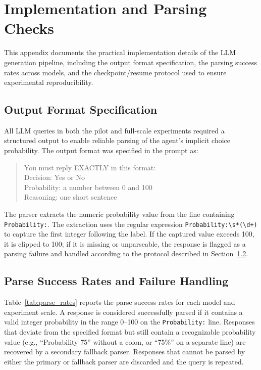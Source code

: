 \documentclass[11pt]{article}
\begin{document}
\section{Implementation and Parsing Checks}
\label{app:implementation}

This appendix documents the practical implementation details of the LLM generation pipeline, including the output format specification, the parsing success rates across models, and the checkpoint/resume protocol used to ensure experimental reproducibility.

\subsection{Output Format Specification}
\label{app:output_format}

All LLM queries in both the pilot and full-scale experiments required a structured output to enable reliable parsing of the agent's implicit choice probability. The output format was specified in the prompt as:

\begin{quote}\small
You must reply EXACTLY in this format:\\
Decision: Yes or No\\
Probability: a number between 0 and 100\\
Reasoning: one short sentence
\end{quote}

The parser extracts the numeric probability value from the line containing \texttt{Probability:}. The extraction uses the regular expression \texttt{Probability:\textbackslash s*(\textbackslash d+)} to capture the first integer following the label. If the captured value exceeds 100, it is clipped to 100; if it is missing or unparseable, the response is flagged as a parsing failure and handled according to the protocol described in Section~\ref{app:parse_handling}.

\subsection{Parse Success Rates and Failure Handling}
\label{app:parse_handling}

Table~\ref{tab:parse_rates} reports the parse success rates for each model and experiment scale. A response is considered successfully parsed if it contains a valid integer probability in the range 0--100 on the \texttt{Probability:} line. Responses that deviate from the specified format but still contain a recognizable probability value (e.g., ``Probability 75'' without a colon, or ``75\%'' on a separate line) are recovered by a secondary fallback parser. Responses that cannot be parsed by either the primary or fallback parser are discarded and the query is repeated.
\end{document}

